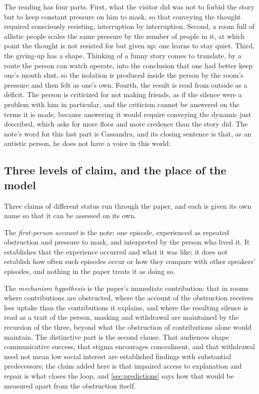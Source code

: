 The reading has four parts. First, what the visitor did was not to forbid the story but to keep constant pressure on him to mask, so that conveying the thought required consciously resisting, interruption by interruption. Second, a room full of allistic people scales the same pressure by the number of people in it, at which point the thought is not resisted for but given up: one learns to stay quiet. Third, the giving-up has a shape. Thinking of a funny story comes to translate, by a route the person can watch operate, into the conclusion that one had better keep one's mouth shut, so the isolation is produced inside the person by the room's pressure and then felt as one's own. Fourth, the result is read from outside as a deficit. The person is criticized for not making friends, as if the silence were a problem with him in particular, and the criticism cannot be answered on the terms it is made, because answering it would require conveying the dynamic just described, which asks for more floor and more credence than the story did. The note's word for this last part is Cassandra, and its closing sentence is that, as an autistic person, he does not have a voice in this world.

\subsection{Three levels of claim, and the place of the model}

Three claims of different status run through the paper, and each is given its own name so that it can be assessed on its own.

The \emph{first-person account} is the note: one episode, experienced as repeated obstruction and pressure to mask, and interpreted by the person who lived it. It establishes that the experience occurred and what it was like; it does not establish how often such episodes occur or how they compare with other speakers' episodes, and nothing in the paper treats it as doing so.

The \emph{mechanism hypothesis} is the paper's immediate contribution: that in rooms where contributions are obstructed, where the account of the obstruction receives less uptake than the contributions it explains, and where the resulting silence is read as a trait of the person, masking and withdrawal are maintained by the recursion of the three, beyond what the obstruction of contributions alone would maintain. The distinctive part is the second clause. That audiences shape communicative success, that stigma encourages concealment, and that withdrawal need not mean low social interest are established findings with substantial predecessors; the claim added here is that impaired access to explanation and repair is what closes the loop, and \autoref{sec:predictions} says how that would be measured apart from the obstruction itself.

